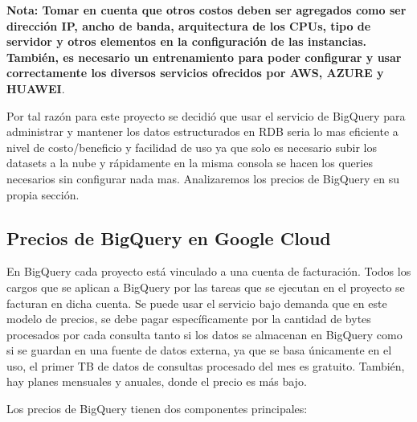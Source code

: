 \documentclass[12pt,a4paper,openright]{article}
\begin{document}
\newpage

\textbf{Nota: Tomar en cuenta que otros costos deben ser agregados como ser dirección IP, ancho de banda, arquitectura de los CPUs, tipo de servidor y otros elementos en la configuración de las instancias. También, es necesario un entrenamiento para poder configurar y usar correctamente los diversos servicios ofrecidos por AWS, AZURE y HUAWEI}.

Por tal razón para este proyecto se decidió que usar el servicio de BigQuery para administrar y mantener los datos estructurados en RDB seria lo mas eficiente a nivel de costo/beneficio y facilidad de uso ya que solo es necesario subir los datasets a la nube y rápidamente en la misma consola se hacen los queries necesarios sin configurar nada mas. Analizaremos los precios de BigQuery en su propia secci\'on.

\subsection{Precios de BigQuery en Google Cloud}

En BigQuery cada proyecto está vinculado a una cuenta de facturación. Todos los cargos que se aplican a BigQuery por las tareas que se ejecutan en el proyecto se facturan en dicha cuenta. Se puede usar el servicio bajo demanda que en este modelo de precios, se debe pagar específicamente por la cantidad de bytes procesados por cada consulta tanto si los datos se almacenan en BigQuery como si se guardan en una fuente de datos externa, ya que se basa únicamente en el uso, el primer TB de datos de consultas procesado del mes es gratuito. También, hay planes mensuales y anuales, donde el precio es más bajo.

Los precios de BigQuery tienen dos componentes principales:
\end{document}
